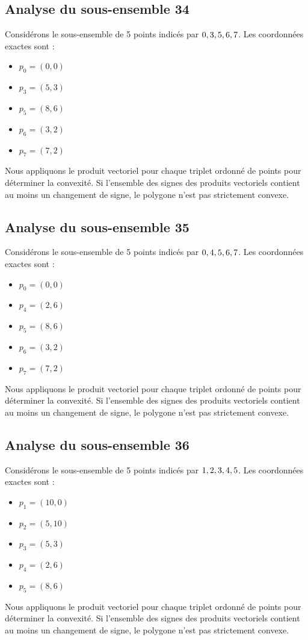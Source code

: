 \documentclass[11pt]{article}
\begin{document}
\subsection{Analyse du sous-ensemble 34}
Considérons le sous-ensemble de 5 points indicés par $\\{ 0, 3, 5, 6, 7 \\}$.
Les coordonnées exactes sont :
\begin{itemize}
\item $p_0 = (0, 0)$
\item $p_3 = (5, 3)$
\item $p_5 = (8, 6)$
\item $p_6 = (3, 2)$
\item $p_7 = (7, 2)$
\end{itemize}
Nous appliquons le produit vectoriel pour chaque triplet ordonné de points pour déterminer la convexité. Si l'ensemble des signes des produits vectoriels contient au moins un changement de signe, le polygone n'est pas strictement convexe.
\newpage

\subsection{Analyse du sous-ensemble 35}
Considérons le sous-ensemble de 5 points indicés par $\\{ 0, 4, 5, 6, 7 \\}$.
Les coordonnées exactes sont :
\begin{itemize}
\item $p_0 = (0, 0)$
\item $p_4 = (2, 6)$
\item $p_5 = (8, 6)$
\item $p_6 = (3, 2)$
\item $p_7 = (7, 2)$
\end{itemize}
Nous appliquons le produit vectoriel pour chaque triplet ordonné de points pour déterminer la convexité. Si l'ensemble des signes des produits vectoriels contient au moins un changement de signe, le polygone n'est pas strictement convexe.
\newpage

\subsection{Analyse du sous-ensemble 36}
Considérons le sous-ensemble de 5 points indicés par $\\{ 1, 2, 3, 4, 5 \\}$.
Les coordonnées exactes sont :
\begin{itemize}
\item $p_1 = (10, 0)$
\item $p_2 = (5, 10)$
\item $p_3 = (5, 3)$
\item $p_4 = (2, 6)$
\item $p_5 = (8, 6)$
\end{itemize}
Nous appliquons le produit vectoriel pour chaque triplet ordonné de points pour déterminer la convexité. Si l'ensemble des signes des produits vectoriels contient au moins un changement de signe, le polygone n'est pas strictement convexe.
\newpage
\end{document}
